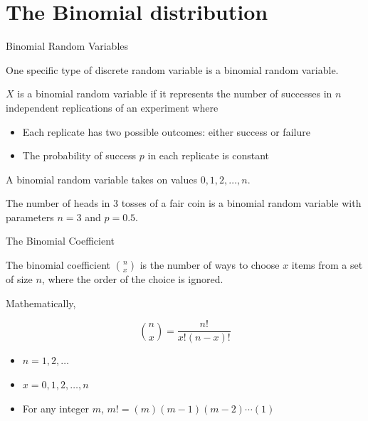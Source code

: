 \documentclass[ignorenonframetext,aspectratio=169]{beamer}
\providecommand{\tightlist}{%
  \setlength{\itemsep}{0pt}\setlength{\parskip}{0pt}}
\begin{document}
\section{The Binomial distribution}\label{the-binomial-distribution}

\begin{frame}{Binomial Random Variables}

One specific type of discrete random variable is a binomial random
variable.

\(X\) is a binomial random variable if it represents the number of
successes in \(n\) independent replications of an experiment where

\begin{itemize}
\tightlist
\item
  Each replicate has two possible outcomes: either success or failure
\item
  The probability of success \(p\) in each replicate is constant
\end{itemize}

A binomial random variable takes on values \(0, 1, 2, \dots, n\).

The number of heads in 3 tosses of a fair coin is a binomial random
variable with parameters \(n = 3\) and \(p = 0.5\).

\end{frame}

\begin{frame}{The Binomial Coefficient}

The binomial coefficient \(\binom{n}{x}\) is the number of ways to
choose \(x\) items from a set of size \(n\), where the order of the
choice is ignored.

Mathematically,

\[\binom{n} {x} = \frac{n!}{x!(n-x)!}\]

\begin{itemize}
\item
  \(n = 1, 2, \ldots\)
\item
  \(x = 0, 1, 2, \ldots, n\)
\item
  For any integer \(m\), \(m! = (m)(m-1)(m-2)\cdots(1)\)
\end{itemize}

\end{frame}
\end{document}
